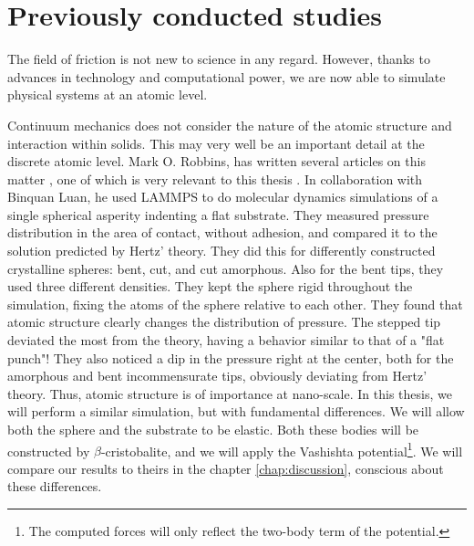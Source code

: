 \documentclass[twoside,english]{uiofysmaster}
\begin{document}
\section{Previously conducted studies}
The field of friction is not new to science in any regard. 
However, thanks to advances in technology and computational power, we are now able to simulate physical systems at an atomic level. 




Continuum mechanics does not consider the nature of the atomic structure and interaction within solids. 
This may very well be an important detail at the discrete atomic level. 
Mark O. Robbins, has written several articles on this matter \cite{Robbins2005,RobbinsSingleAsperity,RobbinsSimpleMicroscopicTheroyOfAmontonsLawsOfFriction, RobbinsDefiningContactAtTheAtomicScale},  
one of which is very relevant to this thesis \cite{RobbinsSingleAsperity}. 
In collaboration with Binquan Luan, he used LAMMPS to do molecular dynamics simulations of a single spherical asperity indenting a flat substrate. 
They measured pressure distribution in the area of contact, without adhesion, and compared it to the solution predicted by Hertz' theory. 
They did this for differently constructed crystalline spheres: bent, cut, and
cut amorphous. 
Also for the bent tips, they used three different densities. 
They kept the sphere rigid throughout the simulation, fixing the atoms of the sphere relative to each other. 
They found that atomic structure clearly changes the distribution of pressure.
The stepped tip deviated the most from the theory, having a behavior similar to that of a "flat punch"!  
They also noticed a dip in the pressure right at the center, both for the amorphous and bent incommensurate tips, obviously deviating from Hertz' theory.
Thus, atomic structure is of importance at nano-scale.
In this thesis, we will perform a similar simulation, but with fundamental differences. 
We will allow both the sphere and the substrate to be elastic. 
Both these bodies will be constructed by $\beta$-cristobalite, and we will apply the Vashishta potential\footnote{The computed forces will only reflect the two-body term of the potential.}.  
We will compare our results to theirs in the chapter \ref{chap:discussion}, conscious about these differences.
\end{document}

